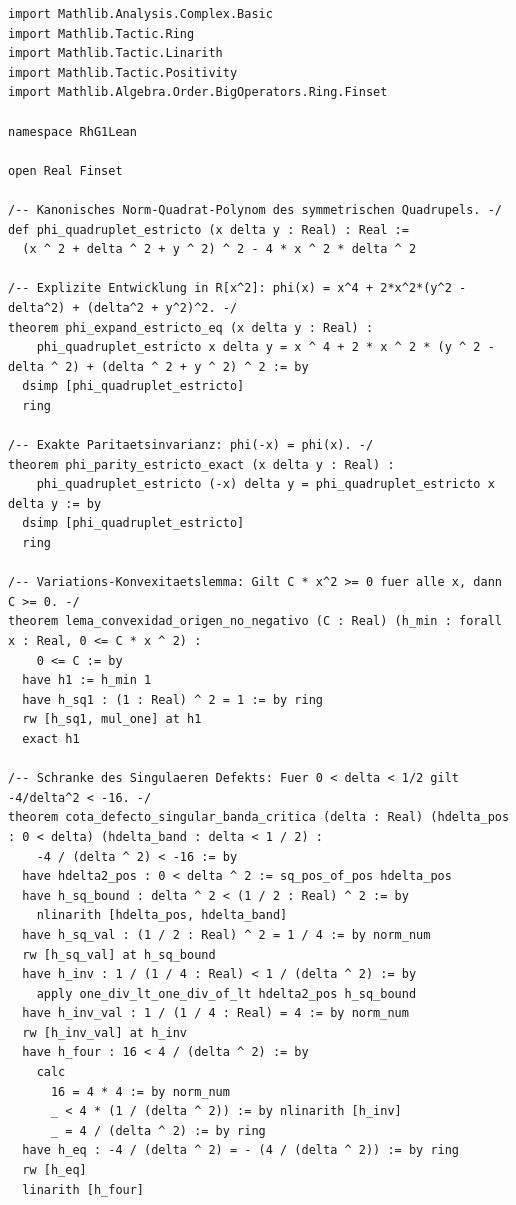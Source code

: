 \documentclass[11pt,a4paper]{article}
\theoremstyle{definition}
\theoremstyle{remark}
\begin{document}
\begin{lstlisting}[language=Lean4]
import Mathlib.Analysis.Complex.Basic
import Mathlib.Tactic.Ring
import Mathlib.Tactic.Linarith
import Mathlib.Tactic.Positivity
import Mathlib.Algebra.Order.BigOperators.Ring.Finset

namespace RhG1Lean

open Real Finset

/-- Kanonisches Norm-Quadrat-Polynom des symmetrischen Quadrupels. -/
def phi_quadruplet_estricto (x delta y : Real) : Real :=
  (x ^ 2 + delta ^ 2 + y ^ 2) ^ 2 - 4 * x ^ 2 * delta ^ 2

/-- Explizite Entwicklung in R[x^2]: phi(x) = x^4 + 2*x^2*(y^2 - delta^2) + (delta^2 + y^2)^2. -/
theorem phi_expand_estricto_eq (x delta y : Real) :
    phi_quadruplet_estricto x delta y = x ^ 4 + 2 * x ^ 2 * (y ^ 2 - delta ^ 2) + (delta ^ 2 + y ^ 2) ^ 2 := by
  dsimp [phi_quadruplet_estricto]
  ring

/-- Exakte Paritaetsinvarianz: phi(-x) = phi(x). -/
theorem phi_parity_estricto_exact (x delta y : Real) :
    phi_quadruplet_estricto (-x) delta y = phi_quadruplet_estricto x delta y := by
  dsimp [phi_quadruplet_estricto]
  ring

/-- Variations-Konvexitaetslemma: Gilt C * x^2 >= 0 fuer alle x, dann C >= 0. -/
theorem lema_convexidad_origen_no_negativo (C : Real) (h_min : forall x : Real, 0 <= C * x ^ 2) :
    0 <= C := by
  have h1 := h_min 1
  have h_sq1 : (1 : Real) ^ 2 = 1 := by ring
  rw [h_sq1, mul_one] at h1
  exact h1

/-- Schranke des Singulaeren Defekts: Fuer 0 < delta < 1/2 gilt -4/delta^2 < -16. -/
theorem cota_defecto_singular_banda_critica (delta : Real) (hdelta_pos : 0 < delta) (hdelta_band : delta < 1 / 2) :
    -4 / (delta ^ 2) < -16 := by
  have hdelta2_pos : 0 < delta ^ 2 := sq_pos_of_pos hdelta_pos
  have h_sq_bound : delta ^ 2 < (1 / 2 : Real) ^ 2 := by
    nlinarith [hdelta_pos, hdelta_band]
  have h_sq_val : (1 / 2 : Real) ^ 2 = 1 / 4 := by norm_num
  rw [h_sq_val] at h_sq_bound
  have h_inv : 1 / (1 / 4 : Real) < 1 / (delta ^ 2) := by
    apply one_div_lt_one_div_of_lt hdelta2_pos h_sq_bound
  have h_inv_val : 1 / (1 / 4 : Real) = 4 := by norm_num
  rw [h_inv_val] at h_inv
  have h_four : 16 < 4 / (delta ^ 2) := by
    calc
      16 = 4 * 4 := by norm_num
      _ < 4 * (1 / (delta ^ 2)) := by nlinarith [h_inv]
      _ = 4 / (delta ^ 2) := by ring
  have h_eq : -4 / (delta ^ 2) = - (4 / (delta ^ 2)) := by ring
  rw [h_eq]
  linarith [h_four]


\end{lstlisting}
\end{document}
